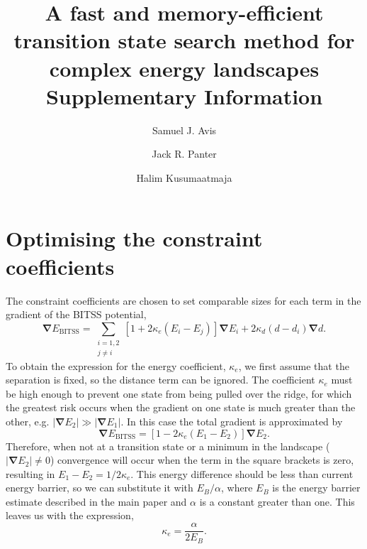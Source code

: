 \documentclass[10pt]{revtex4}
\newcommand{\abs}[1]{\left| #1 \right|}
\newcommand{\grad}{\bm{\nabla}}
\begin{document}
\title{A fast and memory-efficient transition state search method for complex energy landscapes \\ Supplementary Information}
\author{Samuel J. Avis}
\author{Jack R. Panter}
\author{Halim Kusumaatmaja}
\maketitle

\section{Optimising the constraint coefficients}
The constraint coefficients are chosen to set comparable sizes for each term in the gradient of the BITSS potential,
\begin{equation} \label{eq:gradBITSS}
  \grad E_\text{BITSS} = \sum_{\substack{i=1,2 \\ j\neq i}} \left[ 1 + 2 \kappa_e (E_i - E_j) \right] \grad E_i + 2 \kappa_d (d - d_i) \grad d.
\end{equation}
To obtain the expression for the energy coefficient, $\kappa_e$, we first assume that the separation is fixed, so the distance term can be ignored.
The coefficient $\kappa_e$ must be high enough to prevent one state from being pulled over the ridge, for which the greatest risk occurs when the gradient on one state is much greater than the other, e.g. $\abs{\grad E_2} \gg \abs{\grad E_1}$.
In this case the total gradient is approximated by
\begin{equation}
  \grad E_\text{BITSS} = \left[ 1 - 2 \kappa_e (E_1 - E_2) \right] \grad E_2.
\end{equation}
Therefore, when not at a transition state or a minimum in the landscape ($\abs{\grad E_2} \neq 0$) convergence will occur when the term in the square brackets is zero, resulting in $E_1 - E_2 = 1 / 2 \kappa_e$.
This energy difference should be less than current energy barrier, so we can substitute it with $E_B / \alpha$, where $E_B$ is the energy barrier estimate described in the main paper and $\alpha$ is a constant greater than one.
This leaves us with the expression,
\begin{equation}
  \kappa_e = \frac {\alpha} {2 E_B}.
\end{equation}
\end{document}
